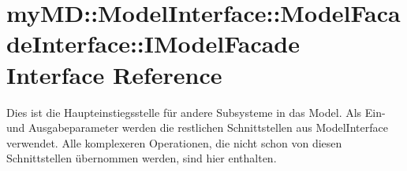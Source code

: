 \hypertarget{interfacemy_m_d_1_1_model_interface_1_1_model_facade_interface_1_1_i_model_facade}{
\section{my\-MD::Model\-Interface::Model\-Facade\-Interface::IModel\-Facade Interface Reference}
\label{de/d3e/interfacemy_m_d_1_1_model_interface_1_1_model_facade_interface_1_1_i_model_facade}
}
Dies ist die Haupteinstiegsstelle f\"{u}r andere Subsysteme in das Model. Als Ein- und Ausgabeparameter werden die restlichen Schnittstellen aus Model\-Interface verwendet. Alle komplexeren Operationen, die nicht schon von diesen Schnittstellen \"{u}bernommen werden, sind hier enthalten.  


